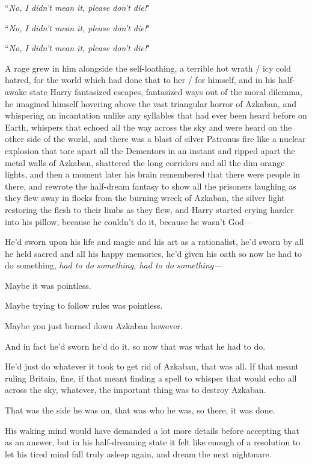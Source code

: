 ``\emph{No, I didn't mean it, please don't die!}"

``\emph{No, I didn't mean it, please don't die!}"

``\emph{No, I didn't mean it, please don't die!}"

A rage grew in him alongside the self-loathing, a terrible hot wrath / icy cold hatred, for the world which had done that to her / for himself, and in his half-awake state Harry fantasized escapes, fantasized ways out of the moral dilemma, he imagined himself hovering above the vast triangular horror of Azkaban, and whispering an incantation unlike any syllables that had ever been heard before on Earth, whispers that echoed all the way across the sky and were heard on the other side of the world, and there was a blast of silver Patronus fire like a nuclear explosion that tore apart all the Dementors in an instant and ripped apart the metal walls of Azkaban, shattered the long corridors and all the dim orange lights, and then a moment later his brain remembered that there were people in there, and rewrote the half-dream fantasy to show all the prisoners laughing as they flew away in flocks from the burning wreck of Azkaban, the silver light restoring the flesh to their limbs as they flew, and Harry started crying harder into his pillow, because he couldn't do it, because he wasn't God---

He'd sworn upon his life and magic and his art as a rationalist, he'd sworn by all he held sacred and all his happy memories, he'd given his oath so now he had to do something, \emph{had to do something, had to \emph{do something---}}

Maybe it was pointless.

Maybe trying to follow rules was pointless.

Maybe you just burned down Azkaban however.

And in fact he'd sworn he'd do it, so now that was what he had to do.

He'd just do whatever it took to get rid of Azkaban, that was all. If that meant ruling Britain, fine, if that meant finding a spell to whisper that would echo all across the sky, whatever, the important thing was to destroy Azkaban.

That was the side he was on, that was who he was, so there, it was done.

His waking mind would have demanded a lot more details before accepting that as an answer, but in his half-dreaming state it felt like enough of a resolution to let his tired mind fall truly asleep again, and dream the next nightmare.

